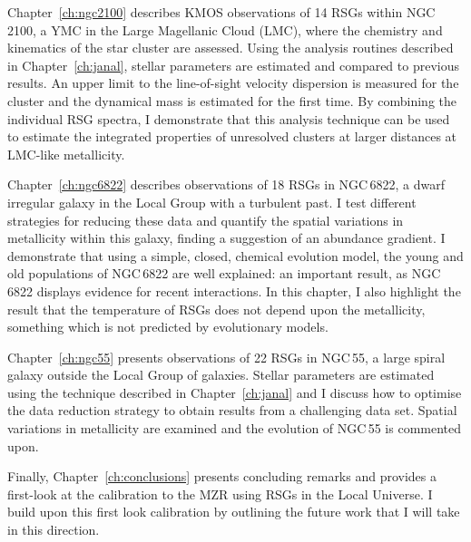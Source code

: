 Chapter~\ref{ch:ngc2100} describes KMOS observations of 14 RSGs within NGC\,2100, a YMC in the Large Magellanic Cloud (LMC), where the chemistry and kinematics of the star cluster are assessed.
Using the analysis routines described in Chapter~\ref{ch:janal}, stellar parameters are estimated and compared to previous results. An upper limit to the line-of-sight velocity dispersion is measured for the cluster and the dynamical mass is estimated for the first time.
By combining the individual RSG spectra, I demonstrate that this analysis technique can be used to estimate the integrated properties of unresolved clusters at larger distances at LMC-like metallicity.

Chapter~\ref{ch:ngc6822} describes observations of 18 RSGs in NGC\,6822, a dwarf irregular galaxy in the Local Group with a turbulent past.
I test different strategies for reducing these data and quantify the spatial variations in metallicity within this galaxy, finding a suggestion of an abundance gradient.
I demonstrate that using a simple, closed, chemical evolution model, the young and old populations of NGC\,6822 are well explained: an important result, as NGC\,6822 displays evidence for recent interactions.
In this chapter, I also highlight the result that the temperature of RSGs does not depend upon the metallicity, something which is not predicted by evolutionary models.

Chapter~\ref{ch:ngc55} presents observations of 22 RSGs in NGC\,55, a large spiral galaxy outside the Local Group of galaxies.
Stellar parameters are estimated using the technique described in Chapter~\ref{ch:janal} and I discuss how to optimise the data reduction strategy to obtain results from a challenging data set.
Spatial variations in metallicity are examined and the evolution of NGC\,55 is commented upon.


Finally, Chapter~\ref{ch:conclusions} presents concluding remarks and provides a first-look at the calibration to the MZR using RSGs in the Local Universe.
I build upon this first look calibration by outlining the future work that I will take in this direction.

% 

